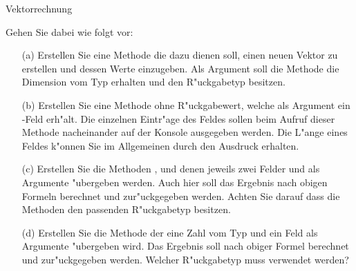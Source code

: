 \begin{exercise}{Vektorrechnung}
\begin{body}
\noindent
Gehen Sie dabei wie folgt vor:
\begin{itemize}
\item [(a)] Erstellen Sie eine Methode  die dazu dienen soll, einen neuen Vektor zu erstellen und dessen Werte einzugeben.
      Als Argument soll die Methode die Dimension  vom Typ  erhalten und den R"uckgabetyp  besitzen.
\item [(b)] Erstellen Sie eine Methode  ohne R"uckgabewert, welche als Argument ein -Feld  erh"alt.
      Die einzelnen Eintr"age des Feldes sollen beim Aufruf dieser Methode nacheinander auf der Konsole ausgegeben werden. Die L"ange eines
      Feldes  k"onnen Sie im Allgemeinen durch den Ausdruck  erhalten.
\item [(c)] Erstellen Sie die Methoden ,  und  denen jeweils zwei Felder  und  als Argumente "ubergeben werden.
      Auch hier soll das Ergebnis nach obigen Formeln berechnet und zur"uckgegeben werden. Achten Sie darauf dass die Methoden den passenden R"uckgabetyp besitzen.
\item [(d)] Erstellen Sie die Methode  der eine Zahl  vom Typ  und ein Feld  als Argumente "ubergeben wird.
      Das Ergebnis soll nach obiger Formel berechnet und zur"uckgegeben werden. Welcher R"uckgabetyp muss verwendet werden?
\end{itemize}

\end{body}

\begin{solution}
\end{solution}
\end{exercise}
